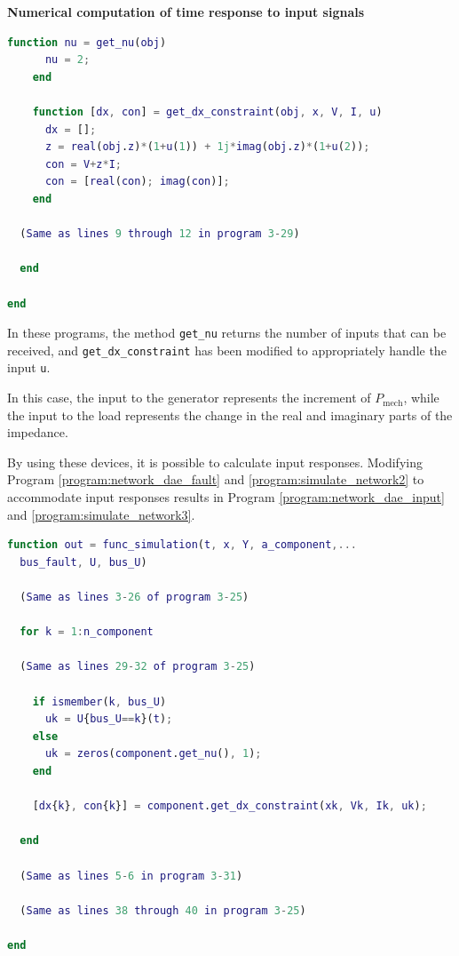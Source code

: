 \documentclass[graybox, envcountchap]{svmult}
\begin{document}
\begin{example}{\textbf{Numerical computation of time response to input signals}}
\begin{lstlisting}[language=Matlab, caption=load\_impedance.m, label={program:load3}]
    function nu = get_nu(obj)
      nu = 2;
    end

    function [dx, con] = get_dx_constraint(obj, x, V, I, u)
      dx = [];
      z = real(obj.z)*(1+u(1)) + 1j*imag(obj.z)*(1+u(2));
      con = V+z*I;
      con = [real(con); imag(con)];
    end

  (Same as lines 9 through 12 in program 3-29)

  end

end
\end{lstlisting}

In these programs, the method \verb|get_nu| returns the number of inputs that
can be received, and \verb|get_dx_constraint| has been modified to appropriately
handle the input \verb|u|.

In this case, the input to the generator represents the increment of
$P_\mathrm{mech}$, while the input to the load represents the change in the real
and imaginary parts of the impedance.

By using these devices, it is possible to calculate input responses. Modifying
Program \ref{program:network_dae_fault} and \ref{program:simulate_network2} to
accommodate input responses results in Program \ref{program:network_dae_input}
and \ref{program:simulate_network3}.

\begin{lstlisting}[language=Matlab, caption=func\_simulation.m, label={program:network_dae_input}]
function out = func_simulation(t, x, Y, a_component,...
  bus_fault, U, bus_U)

  (Same as lines 3-26 of program 3-25)

  for k = 1:n_component

  (Same as lines 29-32 of program 3-25)
    
    if ismember(k, bus_U)
      uk = U{bus_U==k}(t);
    else
      uk = zeros(component.get_nu(), 1);
    end
    
    [dx{k}, con{k}] = component.get_dx_constraint(xk, Vk, Ik, uk);
    
  end

  (Same as lines 5-6 in program 3-31)

  (Same as lines 38 through 40 in program 3-25)

end
\end{lstlisting}


\begin{lstlisting}[language=Matlab, caption=simulate\_power\_system.m, label={program:simulate_network3}]


\end{lstlisting}
\end{example}
\end{document}
